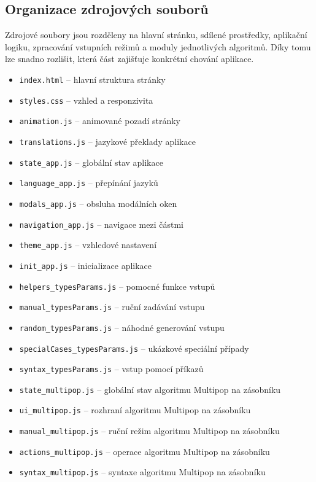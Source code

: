 \subsection{Organizace zdrojových souborů}
Zdrojové soubory jsou rozděleny na hlavní stránku, sdílené prostředky, aplikační logiku, zpracování vstupních režimů a moduly jednotlivých algoritmů. Díky tomu lze snadno rozlišit, která část zajišťuje konkrétní chování aplikace.

\begin{itemize}
    \item \texttt{index.html} -- hlavní struktura stránky
    \item \texttt{styles.css} -- vzhled a responzivita
    \item \texttt{animation.js} -- animované pozadí stránky
    \item \texttt{translations.js} -- jazykové překlady aplikace
    \item \texttt{state\_app.js} -- globální stav aplikace
    \item \texttt{language\_app.js} -- přepínání jazyků
    \item \texttt{modals\_app.js} -- obsluha modálních oken
    \item \texttt{navigation\_app.js} -- navigace mezi částmi
    \item \texttt{theme\_app.js} -- vzhledové nastavení
    \item \texttt{init\_app.js} -- inicializace aplikace
    \item \texttt{helpers\_typesParams.js} -- pomocné funkce vstupů
    \item \texttt{manual\_typesParams.js} -- ruční zadávání vstupu
    \item \texttt{random\_typesParams.js} -- náhodné generování vstupu
    \item \texttt{specialCases\_typesParams.js} -- ukázkové speciální případy
    \item \texttt{syntax\_typesParams.js} -- vstup pomocí příkazů
    \item \texttt{state\_multipop.js} -- globální stav algoritmu Multipop na zásobníku
    \item \texttt{ui\_multipop.js} -- rozhraní algoritmu Multipop na zásobníku
    \item \texttt{manual\_multipop.js} -- ruční režim algoritmu Multipop na zásobníku
    \item \texttt{actions\_multipop.js} -- operace algoritmu Multipop na zásobníku
    \item \texttt{syntax\_multipop.js} -- syntaxe algoritmu Multipop na zásobníku

\end{itemize}
